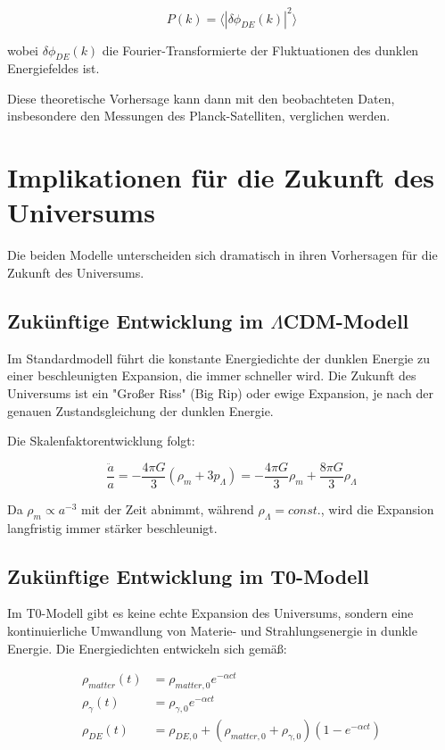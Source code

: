 \documentclass[a4paper,12pt]{article}
\begin{document}
\begin{equation}
	P(k) = \langle|\delta\phi_{DE}(k)|^2\rangle
\end{equation}

wobei $\delta\phi_{DE}(k)$ die Fourier-Transformierte der Fluktuationen des dunklen Energiefeldes ist.

Diese theoretische Vorhersage kann dann mit den beobachteten Daten, insbesondere den Messungen des Planck-Satelliten, verglichen werden.

\section{Implikationen für die Zukunft des Universums}

Die beiden Modelle unterscheiden sich dramatisch in ihren Vorhersagen für die Zukunft des Universums.

\subsection{Zukünftige Entwicklung im $\Lambda$CDM-Modell}

Im Standardmodell führt die konstante Energiedichte der dunklen Energie zu einer beschleunigten Expansion, die immer schneller wird. Die Zukunft des Universums ist ein "Großer Riss" (Big Rip) oder ewige Expansion, je nach der genauen Zustandsgleichung der dunklen Energie.

Die Skalenfaktorentwicklung folgt:

\begin{equation}
	\frac{\ddot{a}}{a} = -\frac{4\pi G}{3}(\rho_m + 3p_\Lambda) = -\frac{4\pi G}{3}\rho_m + \frac{8\pi G}{3}\rho_\Lambda
\end{equation}

Da $\rho_m \propto a^{-3}$ mit der Zeit abnimmt, während $\rho_\Lambda = const.$, wird die Expansion langfristig immer stärker beschleunigt.

\subsection{Zukünftige Entwicklung im T0-Modell}

Im T0-Modell gibt es keine echte Expansion des Universums, sondern eine kontinuierliche Umwandlung von Materie- und Strahlungsenergie in dunkle Energie. Die Energiedichten entwickeln sich gemäß:

\begin{align}
	\rho_{matter}(t) &= \rho_{matter,0} e^{-\alpha c t} \\
	\rho_{\gamma}(t) &= \rho_{\gamma,0} e^{-\alpha c t} \\
	\rho_{DE}(t) &= \rho_{DE,0} + (\rho_{matter,0} + \rho_{\gamma,0})(1 - e^{-\alpha c t})
\end{align}
\end{document}
